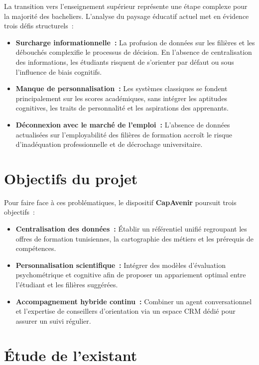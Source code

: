 La transition vers l'enseignement supérieur représente une étape complexe pour la majorité des bacheliers. L'analyse du paysage éducatif actuel met en évidence trois défis structurels~:

\begin{itemize}
    \item \textbf{Surcharge informationnelle~:} La profusion de données sur les filières et les débouchés complexifie le processus de décision. En l'absence de centralisation des informations, les étudiants risquent de s'orienter par défaut ou sous l'influence de biais cognitifs.
    \item \textbf{Manque de personnalisation~:} Les systèmes classiques se fondent principalement sur les scores académiques, sans intégrer les aptitudes cognitives, les traits de personnalité et les aspirations des apprenants.
    \item \textbf{Déconnexion avec le marché de l'emploi~:} L'absence de données actualisées sur l'employabilité des filières de formation accroît le risque d'inadéquation professionnelle et de décrochage universitaire.
\end{itemize}

\section{Objectifs du projet}
\label{sec:objectifs}

Pour faire face à ces problématiques, le dispositif \textbf{CapAvenir} poursuit trois objectifs~:

\begin{itemize}
    \item \textbf{Centralisation des données~:} Établir un référentiel unifié regroupant les offres de formation tunisiennes, la cartographie des métiers et les prérequis de compétences.
    \item \textbf{Personnalisation scientifique~:} Intégrer des modèles d'évaluation psychométrique et cognitive afin de proposer un appariement optimal entre l'étudiant et les filières suggérées.
    \item \textbf{Accompagnement hybride continu~:} Combiner un agent conversationnel et l'expertise de conseillers d'orientation via un espace CRM dédié pour assurer un suivi régulier.
\end{itemize}

\section{Étude de l'existant}
\label{sec:existant}

